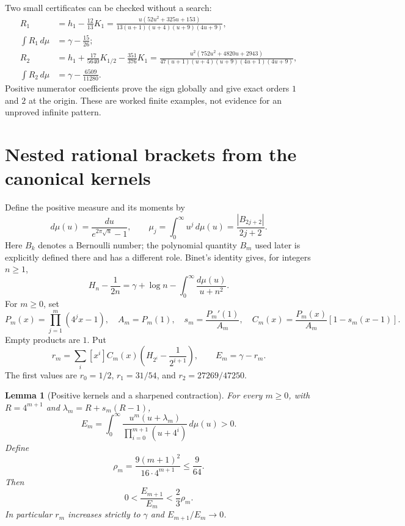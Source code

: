 \documentclass[11pt,a4paper]{article}
\newtheorem{lemma}[theorem]{Lemma}
\theoremstyle{definition}
\theoremstyle{remark}
\begin{document}
Two small certificates can be checked without a search:
\begin{align}
R_1&=h_1-\frac{12}{13}K_1
=\frac{u(52u^2+325u+153)}
{13(u+1)(u+4)(u+9)(4u+9)},\\
\int R_1\,d\mu&=\gamma-\frac{15}{26};\nonumber\\
R_2&=h_1+\frac{17}{5640}K_{1/2}-\frac{351}{376}K_1
=\frac{u^2(752u^2+4820u+2943)}
{47(u+1)(u+4)(u+9)(4u+1)(4u+9)},\\
\int R_2\,d\mu&=\gamma-\frac{6509}{11280}.\nonumber
\end{align}
Positive numerator coefficients prove the sign globally and give exact
orders $1$ and $2$ at the origin. These are worked finite examples,
not evidence for an unproved infinite pattern.


\section{Nested rational brackets from the canonical kernels}
Define the positive measure and its moments by
\[
 d\mu(u)=\frac{du}{e^{2\pi\sqrt u}-1},\qquad
 \mu_j=\int_0^\infty u^j\,d\mu(u)
       =\frac{|B_{2j+2}|}{2j+2}.
\]
Here $B_k$ denotes a Bernoulli number; the polynomial quantity $B_m$
used later is explicitly defined there and has a different role.
Binet's identity \cite{dlmf-binet} gives, for integers $n\ge1$,
\begin{equation}\label{stage3-binet}
 H_n-\frac1{2n}=\gamma+\log n-
       \int_0^\infty\frac{d\mu(u)}{u+n^2}.
\end{equation}
For $m\ge0$, set
\[
 P_m(x)=\prod_{j=1}^m(4^jx-1),\quad A_m=P_m(1),\quad
 s_m=\frac{P_m'(1)}{A_m},\quad
 C_m(x)=\frac{P_m(x)}{A_m}[1-s_m(x-1)].
\]
Empty products are $1$. Put
\[
 r_m=\sum_i[x^i]C_m(x)
       \left(H_{2^i}-\frac1{2^{i+1}}\right),\qquad
 E_m=\gamma-r_m.
\]
The first values are $r_0=1/2$, $r_1=31/54$, and
$r_2=27269/47250$.

\begin{lemma}[Positive kernels and a sharpened contraction]
\label{stage3-canonical-baseline}
For every $m\ge0$, with $R=4^{m+1}$ and
$\lambda_m=R+s_m(R-1)$,
\begin{equation}\label{stage3-canonical-integral}
 E_m=\int_0^\infty
 \frac{u^m(u+\lambda_m)}{\prod_{i=0}^{m+1}(u+4^i)}\,d\mu(u)>0.
\end{equation}
Define
\[
 \rho_m=\frac{9(m+1)^2}{16\cdot4^{m+1}}\le\frac9{64}.
\]
Then
\begin{equation}\label{stage3-sharpened-ratio}
 0<\frac{E_{m+1}}{E_m}<\frac23\rho_m.
\end{equation}
In particular $r_m$ increases strictly to $\gamma$ and
$E_{m+1}/E_m\to0$.
\end{lemma}
\end{document}
